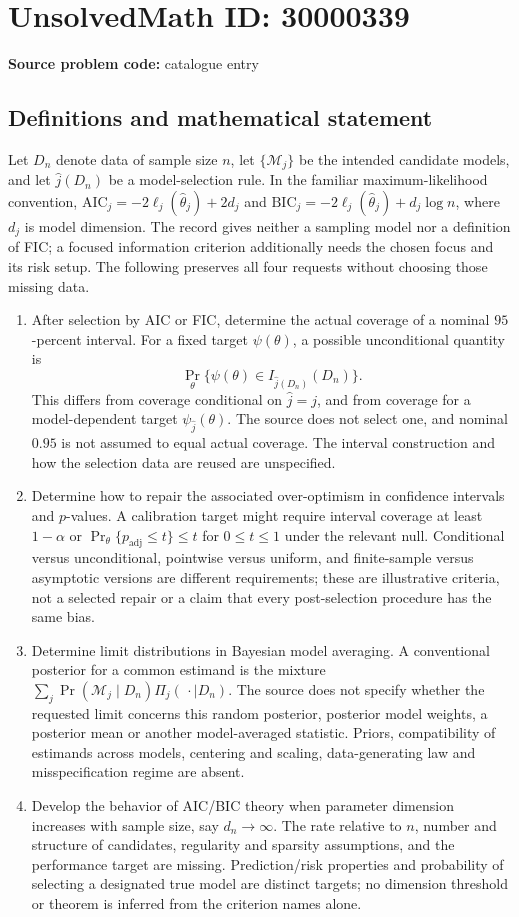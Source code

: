 \documentclass[11pt]{article}
\begin{document}
\section*{UnsolvedMath ID: 30000339}
\textbf{Source problem code:} catalogue entry
\subsection{Definitions and mathematical statement}
Let \(D_n\) denote data of sample size \(n\), let \(\{\mathcal M_j\}\) be the intended candidate models, and let \(\widehat j(D_n)\) be a model-selection rule. In the familiar maximum-likelihood convention, \(\mathrm{AIC}_j=-2\ell_j(\widehat\theta_j)+2d_j\) and \(\mathrm{BIC}_j=-2\ell_j(\widehat\theta_j)+d_j\log n\), where \(d_j\) is model dimension. The record gives neither a sampling model nor a definition of FIC; a focused information criterion additionally needs the chosen focus and its risk setup. The following preserves all four requests without choosing those missing data.
\begin{enumerate}
\item After selection by AIC or FIC, determine the actual coverage of a nominal \(95\)-percent interval. For a fixed target \(\psi(\theta)\), a possible unconditional quantity is
\[
 \Pr_\theta\{\psi(\theta)\in I_{\widehat j(D_n)}(D_n)\}.
\]
This differs from coverage conditional on \(\widehat j=j\), and from coverage for a model-dependent target \(\psi_{\widehat j}(\theta)\). The source does not select one, and nominal \(0.95\) is not assumed to equal actual coverage. The interval construction and how the selection data are reused are unspecified.
\item Determine how to repair the associated over-optimism in confidence intervals and \(p\)-values. A calibration target might require interval coverage at least \(1-\alpha\) or \(\Pr_\theta\{p_{\mathrm{adj}}\leq t\}\leq t\) for \(0\leq t\leq1\) under the relevant null. Conditional versus unconditional, pointwise versus uniform, and finite-sample versus asymptotic versions are different requirements; these are illustrative criteria, not a selected repair or a claim that every post-selection procedure has the same bias.
\item Determine limit distributions in Bayesian model averaging. A conventional posterior for a common estimand is the mixture \(\sum_j\Pr(\mathcal M_j\mid D_n)\Pi_j(\,\cdot\mid D_n)\). The source does not specify whether the requested limit concerns this random posterior, posterior model weights, a posterior mean or another model-averaged statistic. Priors, compatibility of estimands across models, centering and scaling, data-generating law and misspecification regime are absent.
\item Develop the behavior of AIC/BIC theory when parameter dimension increases with sample size, say \(d_n\to\infty\). The rate relative to \(n\), number and structure of candidates, regularity and sparsity assumptions, and the performance target are missing. Prediction/risk properties and probability of selecting a designated true model are distinct targets; no dimension threshold or theorem is inferred from the criterion names alone.
\end{enumerate}
\end{document}
